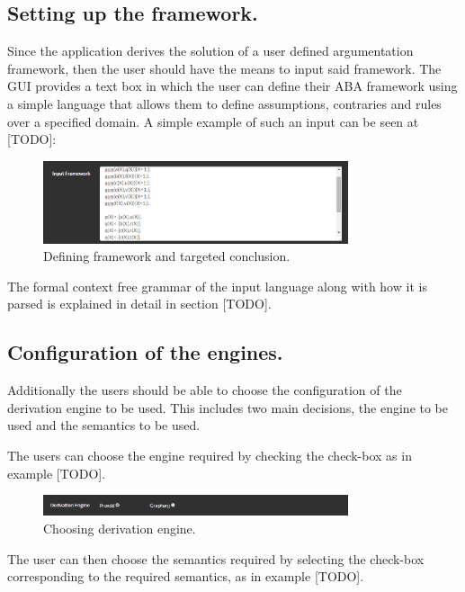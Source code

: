 \subsection{Setting up the framework.}

Since the application derives the solution of a user defined argumentation framework, then the user should have the means to input said framework. The GUI provides a text box in which the user can define their ABA framework using a simple language that allows them to define assumptions, contraries and rules over a specified domain. A simple example of such an input can be seen at [TODO]:

\begin{figure}[h]
    \centering
    \includegraphics[width=0.8\textwidth]{argumentationText.png}
    \caption{Defining framework and targeted conclusion.}
    \label{fig:arg_text}
\end{figure}

The formal context free grammar of the input language along with how it is parsed is explained in detail in section [TODO].

\subsection{Configuration of the engines.}

Additionally the users should be able to choose the configuration of the derivation engine to be used. This includes two main decisions, the engine to be used and the semantics to be used.

The users can choose the engine required by checking the check-box as in example [TODO].

\begin{figure}[h]
    \centering
    \includegraphics[width=0.8\textwidth]{argumentationEngines.png}
    \caption{Choosing derivation engine.}
    \label{fig:arg_engines}
\end{figure}

The user can then choose the semantics required by selecting the check-box corresponding to the required semantics, as in example [TODO].

